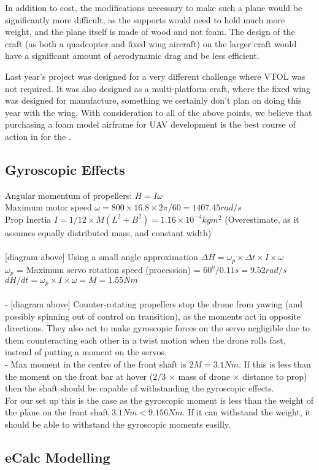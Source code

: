 In addition to cost, the modifications necessary to make such a plane would be significantly more difficult, as the supports would need to hold much more weight, and the plane itself is made of wood and not foam. \color{red} The design of the craft (as both a quadcopter and fixed wing aircraft) on the larger craft would have a significant amount of aerodynamic drag and be less efficient. \color{black}\\
	
Last year's project was designed for a very different challenge where VTOL was not required. It was also designed as a multi-platform craft, where the fixed wing was designed for manufacture, something we certainly don't plan on doing this year with the wing. With consideration to all of the above points, we believe that purchasing a foam model airframe for UAV development is the best course of action in for the \ID.

\subsection{Gyroscopic Effects}
\label{sec:gyro}
Angular momentum of propellers: $H = I\omega$\\
Maximum motor speed $\omega = 800\times16.8\times2\pi/60 = 1407.45rad/s$\\
Prop Inertia $I = 1/12\times M(L^2+B^2) = 1.16\times10^{-4}kgm^2$ (Overestimate, as it assumes equally distributed mass, and constant width)\\\\

[diagram above] Using a small angle approximation $\Delta H = \omega_p \times\Delta t \times I \times \omega$\\ 
$\omega_p$ = Maximum servo rotation speed (procession) = $60^o/0.11s = 9.52rad/s$\\
$dH/dt = \omega_p \times I \times \omega = M = 1.55Nm$\\\\

- [diagram above] Counter-rotating propellers stop the drone from yawing (and possibly spinning out of control on transition), as the moments act in opposite directions. They also act to make gyroscopic forces on the servo negligible due to them counteracting each other in a twist motion when the drone rolls fast, instead of putting a moment on the servos.\\
- Max moment in the centre of the front shaft is $2M = 3.1Nm$. If this is less than the moment on the front bar at hover ($2/3$ $\times $ mass of drone $\times$ distance to prop) then the shaft should be capable of withstanding the gyroscopic effects.\\
For our set up this is the case as the gyroscopic moment is less than the weight of the plane on the front shaft $3.1Nm < 9.156Nm$. If it can withstand the weight, it should be able to withstand the gyroscopic moments easilly.

\subsection{eCalc Modelling}
\label{sec:ecalc}